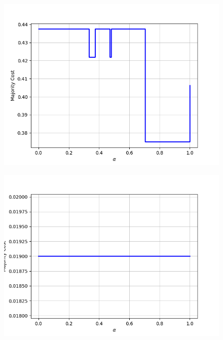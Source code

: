 \begin{figure}[h]\ContinuedFloat
\centering
\begin{minipage}{.24\textwidth}
  \centering
  {\includegraphics[width=\linewidth]{plots/nell-sc/personnorthamerica}}
\end{minipage}
\begin{minipage}{.24\textwidth}
  \centering
  {\includegraphics[width=\linewidth]{plots/nell-sc/physiologicalcondition}}
\end{minipage}
\begin{minipage}{.24\textwidth}
  \centering

\end{minipage}
\end{figure}
